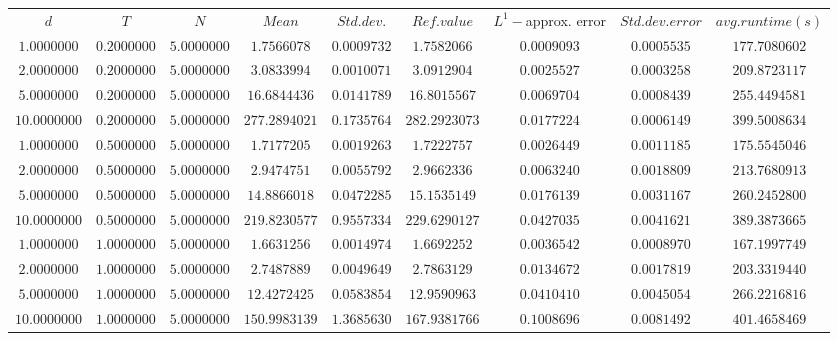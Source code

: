 \begin{tabular}{ccccccccc}
$d$ & $T$ & $N$ & $Mean$ & $Std. dev.$ & $Ref. value$ & $L^1-$approx. error & $Std. dev. error$ & $avg. runtime (s)$\\
$1.0000000$ & $0.2000000$ & $5.0000000$ & $1.7566078$ & $0.0009732$ & $1.7582066$ & $0.0009093$ & $0.0005535$ & $177.7080602$\\
$2.0000000$ & $0.2000000$ & $5.0000000$ & $3.0833994$ & $0.0010071$ & $3.0912904$ & $0.0025527$ & $0.0003258$ & $209.8723117$\\
$5.0000000$ & $0.2000000$ & $5.0000000$ & $16.6844436$ & $0.0141789$ & $16.8015567$ & $0.0069704$ & $0.0008439$ & $255.4494581$\\
$10.0000000$ & $0.2000000$ & $5.0000000$ & $277.2894021$ & $0.1735764$ & $282.2923073$ & $0.0177224$ & $0.0006149$ & $399.5008634$\\
$1.0000000$ & $0.5000000$ & $5.0000000$ & $1.7177205$ & $0.0019263$ & $1.7222757$ & $0.0026449$ & $0.0011185$ & $175.5545046$\\
$2.0000000$ & $0.5000000$ & $5.0000000$ & $2.9474751$ & $0.0055792$ & $2.9662336$ & $0.0063240$ & $0.0018809$ & $213.7680913$\\
$5.0000000$ & $0.5000000$ & $5.0000000$ & $14.8866018$ & $0.0472285$ & $15.1535149$ & $0.0176139$ & $0.0031167$ & $260.2452800$\\
$10.0000000$ & $0.5000000$ & $5.0000000$ & $219.8230577$ & $0.9557334$ & $229.6290127$ & $0.0427035$ & $0.0041621$ & $389.3873665$\\
$1.0000000$ & $1.0000000$ & $5.0000000$ & $1.6631256$ & $0.0014974$ & $1.6692252$ & $0.0036542$ & $0.0008970$ & $167.1997749$\\
$2.0000000$ & $1.0000000$ & $5.0000000$ & $2.7487889$ & $0.0049649$ & $2.7863129$ & $0.0134672$ & $0.0017819$ & $203.3319440$\\
$5.0000000$ & $1.0000000$ & $5.0000000$ & $12.4272425$ & $0.0583854$ & $12.9590963$ & $0.0410410$ & $0.0045054$ & $266.2216816$\\
$10.0000000$ & $1.0000000$ & $5.0000000$ & $150.9983139$ & $1.3685630$ & $167.9381766$ & $0.1008696$ & $0.0081492$ & $401.4658469$\\
\end{tabular}
